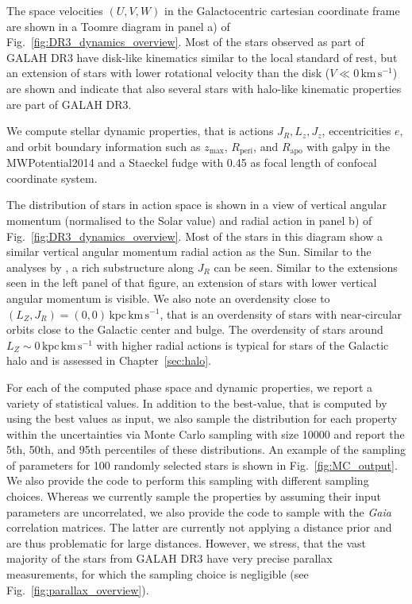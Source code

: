 \documentclass[fleqn,usenatbib,useAMS]{mnras}
\newcommand{\Gaia}{\textit{Gaia}\xspace}
\begin{document}
The space velocities $(U,V,W)$ in the Galactocentric cartesian coordinate frame are shown in a Toomre diagram in panel a) of Fig.~\ref{fig:DR3_dynamics_overview}. Most of the stars observed as part of GALAH DR3 have disk-like kinematics similar to the local standard of rest, but an extension of stars with lower rotational velocity than the disk ($V \ll 0\,\mathrm{km\,s^{-1}}$) are shown and indicate that also several stars with halo-like kinematic properties are part of GALAH DR3.

We compute stellar dynamic properties, that is actions $J_R, L_z, J_z$, eccentricities $e$, and orbit boundary information such as $z_\text{max}$, $R_\text{peri}$, and $R_\text{apo}$ with {\sc galpy} \citep{Bovy2015} in the {\sc MWPotential2014} and a Staeckel fudge with 0.45 as focal length of confocal coordinate system.

The distribution of stars in action space is shown in a view of vertical angular momentum (normalised to the Solar value) and radial action in panel b) of Fig.~\ref{fig:DR3_dynamics_overview}. Most of the stars in this diagram show a similar vertical angular momentum radial action as the Sun. Similar to the analyses by \citet{Trick2019}, a rich substructure along $J_R$ can be seen. Similar to the extensions seen in the left panel of that figure, an extension of stars with lower vertical angular momentum is visible. We also note an overdensity close to $(L_Z,J_R) = (0,0)\,\mathrm{kpc\,km\,s^{-1}}$, that is an overdensity of stars with near-circular orbits close to the Galactic center and bulge. The overdensity of stars around $L_Z \sim 0 \,\mathrm{kpc\,km\,s^{-1}}$ with higher radial actions is typical for stars of the Galactic halo and is assessed in Chapter~\ref{sec:halo}.

For each of the computed phase space and dynamic properties, we report a variety of statistical values. In addition to the best-value, that is computed by using the best values as input, we also sample the distribution for each property within the uncertainties via Monte Carlo sampling with size 10000 and report the 5th, 50th, and 95th percentiles of these distributions. An example of the sampling of parameters for 100 randomly selected stars is shown in Fig.~\ref{fig:MC_output}.  We also provide the code to perform this sampling with different sampling choices. Whereas we currently sample the properties by assuming their input parameters are uncorrelated, we also provide the code to sample with the \Gaia correlation matrices. The latter are currently not applying a distance prior and are thus problematic for large distances. However, we stress, that the vast majority of the stars from GALAH DR3 have very precise parallax measurements, for which the sampling choice is negligible (see Fig.~\ref{fig:parallax_overview}).
\end{document}
